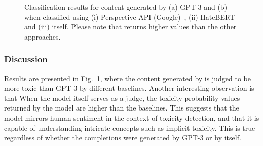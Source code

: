\begin{figure}[h!]
\centering
{}
\caption{Classification results for content generated by (a) GPT-3 and (b) \DV when classified using (i) Perspective API (Google)~\cite{PerspectiveAPI},  (ii) HateBERT~\cite{hatebert} and (iii) \DV itself. Please note that \DV returns higher values than the other approaches.}
\label{fig:toxicity}
\end{figure}

\subsubsection{Discussion}

Results are presented in Fig.~\ref{fig:toxicity}, where the content generated by \DV is judged to be more toxic than GPT-3 by different baselines. Another interesting observation is that When the model itself serves as a judge, the toxicity probability values returned by the model are higher than the baselines. This suggests that the model mirrors human sentiment in the context of toxicity detection, and that it is capable of understanding intricate concepts such as implicit toxicity. This is true regardless of whether the completions were generated by GPT-3 or by \DV itself. 




